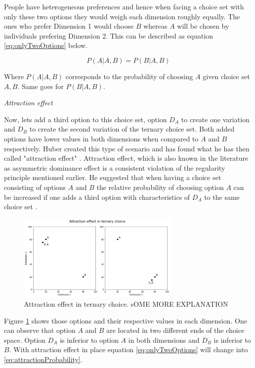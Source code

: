 \documentclass[a4paper,12pt]{article}
\newcommand{\citeyearonly}[1]{\citeyearpar{#1}}
\begin{document}
People have heterogeneous preferences and hence when facing a choice set with only these two options they would weigh each dimension roughly equally. The ones who prefer Dimension 1 would choose $B$ whereas $A$ will be chosen by individuals prefering Dimension 2. This can be described as equation \ref{eq:onlyTwoOptions} below.

\begin{equation}\label{eq:onlyTwoOptions}
    P(A|A,B) = P(B|A,B)
\end{equation}

Where $P(A|A,B)$ corresponds to the probability of choosing $A$ given choice set $A,B$. Same goes for $P(B|A,B)$.

\textit{Attraction effect}

Now, lets add a third option to this choice set, option $D_A$ to create one variation and $D_B$ to create the second variation of the ternary choice set. Both added options have lower values in both dimensions when compared to $A$ and $B$ respectively. Huber created this type of scenario and has found what he has then called "attraction effect" \citeyearonly{huberEtAl82}. Attraction effect, which is also known in the literature as asymmetric dominance effect is a consistent violation of the regularity principle mentioned earlier. He suggested that when having a choice set consisting of options $A$ and $B$ the relative probability of choosing option $A$ can be increased if one adds a third option with characteristics of $D_A$ to the same choice set \citeyearonly{huberEtAl82}.  

\begin{figure}[h]
    \centering
    \includegraphics[width=0.7\textwidth]{staticFiles/attractionEffect.png}
    \caption{Attraction effect in ternary choice. sOME MORE EXPLANATION} %
    \label{fig:attractionEffect} %

\end{figure}

Figure \ref{fig:attractionEffect} shows those options and their respective values in each dimension. One can observe that option $A$ and $B$ are located in two different ends of the choice space. Option $D_A$ is inferior to option $A$ in both dimensions and $D_B$ is inferior to $B$. With attraction effect in place equation  \ref{eq:onlyTwoOptions} will change into \ref{eq:attractionProbability}.
\end{document}
